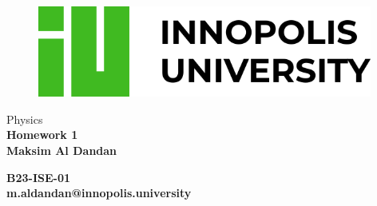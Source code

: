 \begin{titlepage}
\begin{figure}[t]
    \centering\includegraphics[width=0.98\textwidth]{innou-logo.png}
\end{figure}
\vspace{20mm}

\begin{Large}
 \begin{center}
	\vspace{20mm}
    {\LARGE{Physics}}\\
	\vspace{10mm}
	{\huge{\bf Homework 1}}\\
	\vspace{10mm}
	{{\bf Maksim Al Dandan}}\\
\end{center}
\end{Large}


\vspace{36mm}

\begin{center}
    {\large{\bf B23-ISE-01\\m.aldandan@innopolis.university}}
\end{center}
	

\vspace{25mm}

\hrulefill

\vspace{5mm}
\end{titlepage}